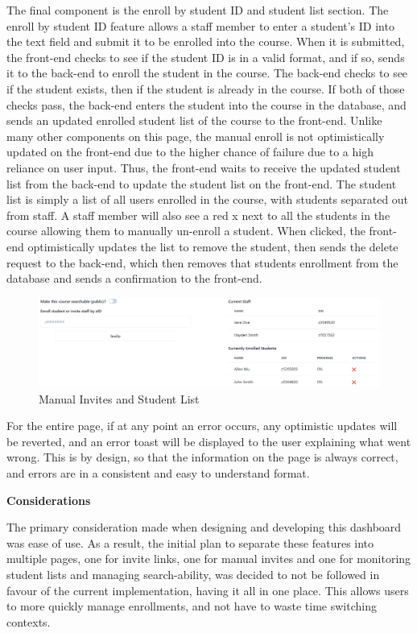 The final component is the enroll by student ID and student list section. The enroll by student ID feature allows a staff member to enter a student's ID into the text field and submit it to be enrolled into the course. When it is submitted, the front-end checks to see if the student ID is in a valid format, and if so, sends it to the back-end to enroll the student in the course. The back-end checks to see if the student exists, then if the student is already in the course. If both of those checks pass, the back-end enters the student into the course in the database, and sends an updated enrolled student list of the course to the front-end. Unlike many other components on this page, the manual enroll is not optimistically updated on the front-end due to the higher chance of failure due to a high reliance on user input. Thus, the front-end waits to receive the updated student list from the back-end to update the student list on the front-end. The student list is simply a list of all users enrolled in the course, with students separated out from staff. A staff member will also see a red x next to all the students in the course allowing them to manually un-enroll a student. When clicked, the front-end optimistically updates the list to remove the student, then sends the delete request to the back-end, which then removes that students enrollment from the database and sends a confirmation to the front-end.

\begin{figure}[h!]
    \centering
    \includegraphics[scale=0.2]{images/accounts-staff-student.jpg}
    \caption{Manual Invites and Student List}
\end{figure}

For the entire page, if at any point an error occurs, any optimistic updates will be reverted, and an error toast will be displayed to the user explaining what went wrong. This is by design, so that the information on the page is always correct, and errors are in a consistent and easy to understand format.

\textbf{Considerations}

The primary consideration made when designing and developing this dashboard was ease of use. As a result, the initial plan to separate these features into multiple pages, one for invite links, one for manual invites and one for monitoring student lists and managing search-ability, was decided to not be followed in favour of the current implementation, having it all in one place. This allows users to more quickly manage enrollments, and not have to waste time switching contexts.

